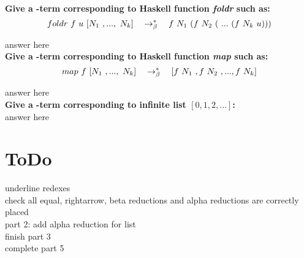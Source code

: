 \documentclass{article}
\begin{document}
	\begin{Large}
		\textbf{Give a \lamb -term corresponding to Haskell function \textit{foldr} such as:}\\
		
		\begin{equation*}
			foldr \ f \ u \ [N_1 \ ,..., \ N_k] \quad \rightarrow_\beta^*\quad f \ N_1\ (f \ N_2 \ ( \ ... \ (f \ N_k \ u)))
		\end{equation*}
		\newline
		
		answer here\\
		
		\textbf{Give a \lamb -term corresponding to Haskell function \textit{map} such as:}\\
		
		\begin{equation*}
			map \ f \ [N_1\ ,..., \ N_k] \equalsT [f \ N_1 \ , f \ N_2 \ ,...,f \ N_k]
		\end{equation*}
		\newline
		
		answer here\\
		
		\textbf{Give a \lamb -term corresponding to infinite list $[0,1,2,...]$:}\\
		
		answer here
	\end{Large}
	
	
	\newpage
	
	\section{ToDo}
	
	\begin{Large}
		underline redexes\\
		
		check all equal, rightarrow, beta reductions and alpha reductions are correctly placed\\
		
		part 2: add alpha reduction for list\\
		
		finish part 3\\
		
		complete part 5\\
	\end{Large}
\end{document}
